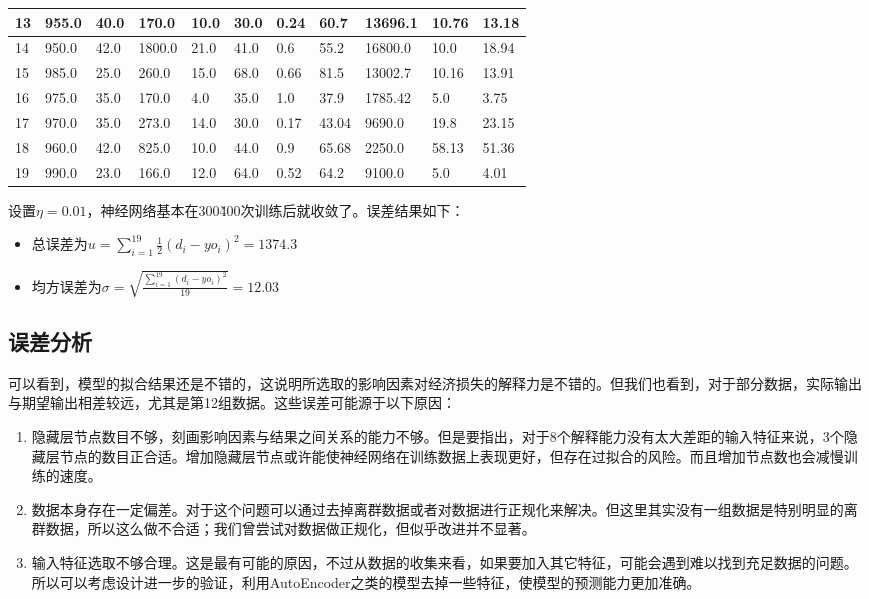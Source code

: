 \documentclass[12pt]{article}
\begin{document}
\begin{table}[h]
\begin{tabular}{|l|l|l|l|l|l|l|l|l|l|l|}
13 & 955.0 & 40.0 & 170.0 & 10.0 & 30.0 & 0.24 & 60.7 & 13696.1 & 10.76 & 13.18 \\ \hline
14 & 950.0 & 42.0 & 1800.0 & 21.0 & 41.0 & 0.6 & 55.2 & 16800.0 & 10.0 & 18.94 \\ \hline
15 & 985.0 & 25.0 & 260.0 & 15.0 & 68.0 & 0.66 & 81.5 & 13002.7 & 10.16 & 13.91 \\ \hline
16 & 975.0 & 35.0 & 170.0 & 4.0 & 35.0 & 1.0 & 37.9 & 1785.42 & 5.0 & 3.75 \\ \hline
17 & 970.0 & 35.0 & 273.0 & 14.0 & 30.0 & 0.17 & 43.04 & 9690.0 & 19.8 & 23.15 \\ \hline
18 & 960.0 & 42.0 & 825.0 & 10.0 & 44.0 & 0.9 & 65.68 & 2250.0 & 58.13 & 51.36 \\ \hline
19 & 990.0 & 23.0 & 166.0 & 12.0 & 64.0 & 0.52 & 64.2 & 9100.0 & 5.0 & 4.01 \\ \hline
\end{tabular}
\end{table}

设置$\eta = 0.01$，神经网络基本在300\~400次训练后就收敛了。误差结果如下：

\begin{itemize}
\item 总误差为$u = \sum_{i=1}^{19} \frac{1}{2}(d_i - yo_i)^2 = 1374.3$
\item 均方误差为$\sigma = \sqrt{\frac{\sum_{i=1}^{19}(d_i - yo_i)^2}{19}} = 12.03$
\end{itemize}

\subsection{误差分析}

可以看到，模型的拟合结果还是不错的，这说明所选取的影响因素对经济损失的解释力是不错的。但我们也看到，对于部分数据，实际输出与期望输出相差较远，尤其是第12组数据。这些误差可能源于以下原因：

\begin{enumerate}
\item 隐藏层节点数目不够，刻画影响因素与结果之间关系的能力不够。但是要指出，对于8个解释能力没有太大差距的输入特征来说，3个隐藏层节点的数目正合适。增加隐藏层节点或许能使神经网络在训练数据上表现更好，但存在过拟合的风险。而且增加节点数也会减慢训练的速度。
\item 数据本身存在一定偏差。对于这个问题可以通过去掉离群数据或者对数据进行正规化来解决。但这里其实没有一组数据是特别明显的离群数据，所以这么做不合适；我们曾尝试对数据做正规化，但似乎改进并不显著。
\item 输入特征选取不够合理。这是最有可能的原因，不过从数据的收集来看，如果要加入其它特征，可能会遇到难以找到充足数据的问题。所以可以考虑设计进一步的验证，利用AutoEncoder之类的模型去掉一些特征，使模型的预测能力更加准确。
\end{enumerate}
\end{document}
